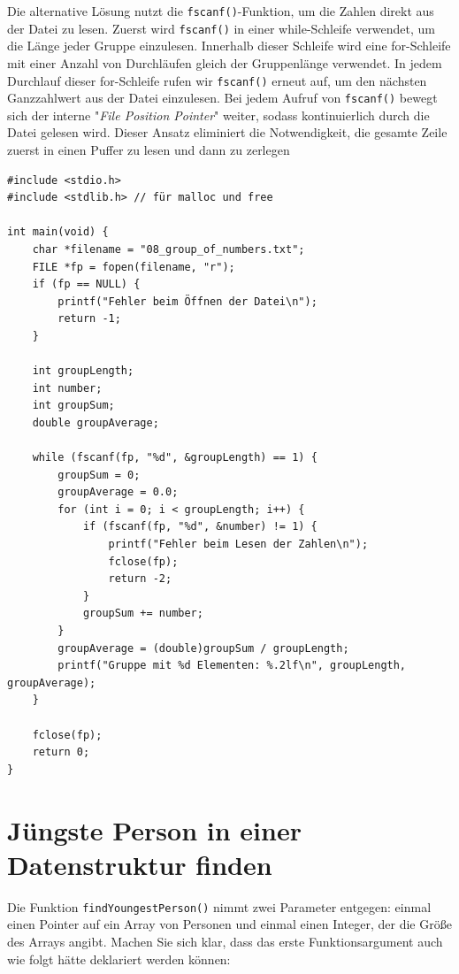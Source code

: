 Die alternative Lösung nutzt die \texttt{fscanf()}-Funktion, um die
Zahlen direkt aus der Datei zu lesen. Zuerst wird \texttt{fscanf()} in
einer while-Schleife verwendet, um die Länge jeder Gruppe einzulesen. Innerhalb
dieser Schleife wird eine for-Schleife mit einer Anzahl von Durchläufen gleich
der Gruppenlänge verwendet. In jedem Durchlauf dieser for-Schleife rufen wir
\texttt{fscanf()} erneut auf, um den nächsten Ganzzahlwert aus der Datei
einzulesen. Bei jedem Aufruf von \texttt{fscanf()} bewegt sich der
interne "\textit{File Position Pointer}" weiter, sodass kontinuierlich durch die
Datei gelesen wird. Dieser Ansatz eliminiert die Notwendigkeit, die gesamte
Zeile zuerst in einen Puffer zu lesen und dann zu zerlegen

\begin{verbatim}
#include <stdio.h>
#include <stdlib.h> // für malloc und free

int main(void) {
    char *filename = "08_group_of_numbers.txt";
    FILE *fp = fopen(filename, "r");
    if (fp == NULL) {
        printf("Fehler beim Öffnen der Datei\n");
        return -1;
    }

    int groupLength;
    int number;
    int groupSum;
    double groupAverage;

    while (fscanf(fp, "%d", &groupLength) == 1) {
        groupSum = 0;
        groupAverage = 0.0;
        for (int i = 0; i < groupLength; i++) {
            if (fscanf(fp, "%d", &number) != 1) {
                printf("Fehler beim Lesen der Zahlen\n");
                fclose(fp);
                return -2;
            }
            groupSum += number;
        }
        groupAverage = (double)groupSum / groupLength;
        printf("Gruppe mit %d Elementen: %.2lf\n", groupLength, groupAverage);
    }

    fclose(fp);
    return 0;
}
\end{verbatim}





\chapter{Jüngste Person in einer Datenstruktur finden}

Die Funktion \texttt{findYoungestPerson()} nimmt zwei Parameter entgegen:
einmal einen Pointer auf ein Array von Personen und einmal einen Integer, der
die Größe des Arrays angibt. Machen Sie sich klar, dass das erste
Funktionsargument auch wie folgt hätte deklariert werden können:

